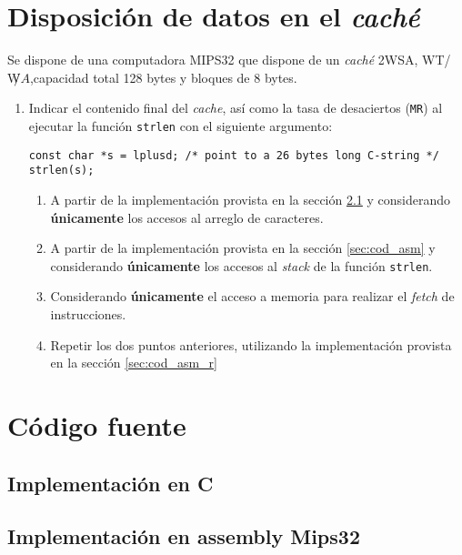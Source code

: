 \documentclass[a4paper]{article}
\begin{document}
\section{Disposición de datos en el \textit{caché}}
Se dispone de una computadora MIPS32 que dispone de un \textit{caché} 2WSA, WT/$\not WA$,capacidad total 128 bytes y 
bloques de 8 bytes.

\begin{enumerate}

\item Indicar el contenido final del \textit{cache}, así como la tasa de desaciertos (\texttt{MR}) al ejecutar la 
función \texttt{strlen} con el siguiente argumento:

\begin{lstlisting}
const char *s = lplusd; /* point to a 26 bytes long C-string */
strlen(s);
\end{lstlisting}
 
\begin{enumerate}[a]
  
  \item A partir de la implementación provista en la sección \ref{sec:cod_c} y considerando \textbf{únicamente} 
	los accesos al arreglo de caracteres.
 
  \item A partir de la implementación provista en la sección \ref{sec:cod_asm} y considerando \textbf{únicamente} 
	los accesos al \textit{stack} de la función \texttt{strlen}.
  
  \item Considerando \textbf{únicamente} el acceso a memoria para realizar el \textit{fetch} de instrucciones.


  \item Repetir los dos puntos anteriores, utilizando la implementación provista en la sección \ref{sec:cod_asm_r}
\end{enumerate}
\end{enumerate}

\section{Código fuente}
\subsection{Implementación en C}
\label{sec:cod_c}


\pagebreak
\subsection{Implementación en assembly Mips32}
\end{document}
